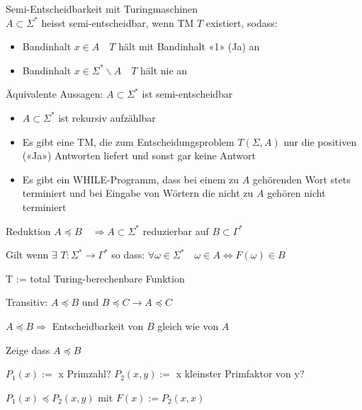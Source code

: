 \begin{concept}{Semi-Entscheidbarkeit mit Turingmaschinen}\\
    $A \subset \Sigma^{*}$ heisst semi-entscheidbar, wenn TM $T$ existiert, sodass:

    \begin{itemize}
    \item Bandinhalt $x \in A \quad T$ hält mit Bandinhalt «1» (Ja) an
    \item Bandinhalt $x \in \Sigma^{*} \backslash A \quad T$ hält nie an
    \end{itemize}

    \vspace{1mm}

    {\small
    Äquivalente Aussagen: $A \subset \Sigma^{*}$ ist semi-entscheidbar
    \begin{itemize}
    \item $A \subset \Sigma^{*}$ ist rekursiv aufzählbar
    \item Es gibt eine TM, die zum Entscheidungsproblem $T(\Sigma, A)$ nur die positiven («Ja») Antworten liefert und sonst gar keine Antwort
    \item Es gibt ein WHILE-Programm, dass bei einem zu $A$ gehörenden Wort stets terminiert und bei Eingabe von Wörtern die nicht zu $A$ gehören nicht terminiert
    \end{itemize}
    }
\end{concept}

\begin{theorem}{Reduktion} $A \preccurlyeq B \quad \Rightarrow A \subset \Sigma^{*}$ reduzierbar auf $B \subset \Gamma^{*}$

    Gilt wenn  $\exists$ $T: \Sigma^{*} \rightarrow \Gamma^{*}$ so dass: $\forall \omega \in \Sigma^{*} \quad \omega \in A \Leftrightarrow F(\omega) \in B$
    
    {\footnotesize T := total Turing-berechenbare Funktion}

    \vspace{1mm}
    
    Transitiv: $A \preccurlyeq B$ und $B \preccurlyeq C \rightarrow A \preccurlyeq C$

    $A \preccurlyeq B \Rightarrow$ Entscheidbarkeit von $B$ gleich wie von $A$
\end{theorem}

\begin{example2}{Zeige dass $A \preccurlyeq B$} 
    
    $P_1(x):=$ x Primzahl? $P_2(x, y):=$ x kleinster Primfaktor von y?

    $P_1(x) \preccurlyeq P_2(x, y)$ mit $F(x):=P_2(x, x)$
\end{example2}


